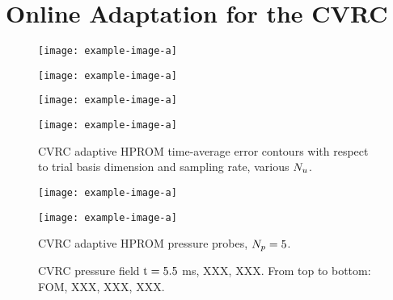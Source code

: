 \section{Online Adaptation for the CVRC}

\begin{figure}
	\begin{minipage}{0.46\linewidth}
		\texttt{[image: example-image-a]}
	\end{minipage}
	\begin{minipage}{0.53\linewidth}
		\texttt{[image: example-image-a]}
	\end{minipage}

	\begin{minipage}{0.46\linewidth}
		\texttt{[image: example-image-a]}
	\end{minipage}
	\begin{minipage}{0.53\linewidth}
		\texttt{[image: example-image-a]}
	\end{minipage}
	\caption{\label{fig:cvrcAdaptiveROMErrContour}CVRC adaptive HPROM time-average error contours with respect to trial basis dimension and sampling rate, various $N_u$.}
\end{figure}

\begin{figure}
    \begin{minipage}{0.49\linewidth}
        \texttt{[image: example-image-a]}
    \end{minipage}
    \begin{minipage}{0.49\linewidth}
        \texttt{[image: example-image-a]}
    \end{minipage}
    \caption{CVRC adaptive HPROM pressure probes, $N_p = 5$.}
\end{figure}

\begin{figure}
	\begin{minipage}{0.99\linewidth}
	\end{minipage}
    \begin{minipage}{0.99\linewidth}
	\end{minipage}
    \caption{CVRC pressure field $\text{t} = 5.5$ ms, XXX, XXX. From top to bottom: FOM, XXX, XXX, XXX.}
\end{figure}

